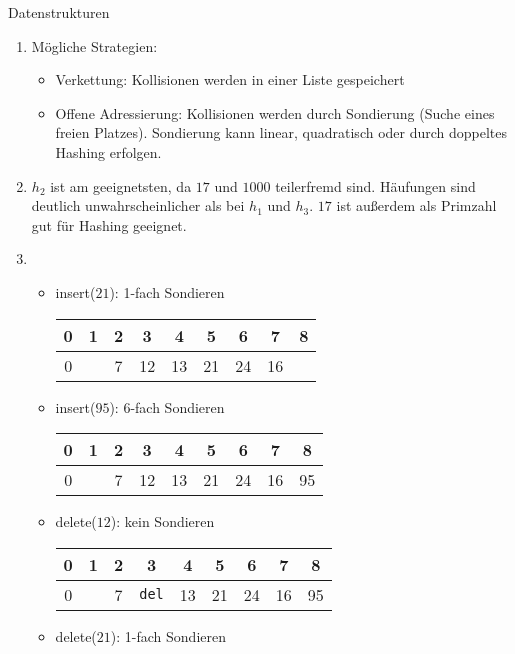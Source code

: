 \documentclass{article}
\begin{document}
\begin{exercise}{Datenstrukturen}
  \begin{solution}
    \begin{enumerate}
      \item Mögliche Strategien:
            \begin{itemize}
              \item Verkettung: Kollisionen werden in einer Liste gespeichert
              \item Offene Adressierung: Kollisionen werden durch Sondierung (Suche eines freien Platzes). Sondierung kann linear, quadratisch oder durch doppeltes Hashing erfolgen.
            \end{itemize}
      \item $h_2$ ist am geeignetsten, da $17$ und $1000$ teilerfremd sind. Häufungen sind deutlich unwahrscheinlicher als bei $h_1$ und $h_3$. $17$ ist außerdem als Primzahl gut für Hashing geeignet.
      \item \begin{itemize}
              \item insert($21$): 1-fach Sondieren \begin{tabular}{c|c|c|c|c|c|c|c|c}
                      0 & 1 & 2 & 3  & 4  & 5  & 6  & 7  & 8 \\
                      \hline
                      0 &   & 7 & 12 & 13 & 21 & 24 & 16 &   \\
                    \end{tabular}
              \item insert($95$): 6-fach Sondieren \begin{tabular}{c|c|c|c|c|c|c|c|c}
                      0 & 1 & 2 & 3  & 4  & 5  & 6  & 7  & 8  \\
                      \hline
                      0 &   & 7 & 12 & 13 & 21 & 24 & 16 & 95 \\
                    \end{tabular}
              \item delete($12$): kein Sondieren \begin{tabular}{c|c|c|c|c|c|c|c|c}
                      0 & 1 & 2 & 3            & 4  & 5  & 6  & 7  & 8  \\
                      \hline
                      0 &   & 7 & \texttt{del} & 13 & 21 & 24 & 16 & 95 \\
                    \end{tabular}
              \item delete($21$): 1-fach Sondieren \begin{tabular}{c|c|c|c|c|c|c|c|c}

\end{tabular}
\end{itemize}
\end{enumerate}
\end{solution}
\end{exercise}
\end{document}
